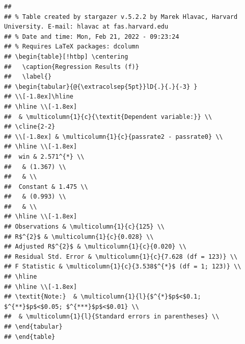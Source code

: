 \documentclass[
  12pt,
  landscape]{article}
\begin{document}
\begin{verbatim}
## 
## % Table created by stargazer v.5.2.2 by Marek Hlavac, Harvard University. E-mail: hlavac at fas.harvard.edu
## % Date and time: Mon, Feb 21, 2022 - 09:23:24
## % Requires LaTeX packages: dcolumn 
## \begin{table}[!htbp] \centering 
##   \caption{Regression Results (f)} 
##   \label{} 
## \begin{tabular}{@{\extracolsep{5pt}}lD{.}{.}{-3} } 
## \\[-1.8ex]\hline 
## \hline \\[-1.8ex] 
##  & \multicolumn{1}{c}{\textit{Dependent variable:}} \\ 
## \cline{2-2} 
## \\[-1.8ex] & \multicolumn{1}{c}{passrate2 - passrate0} \\ 
## \hline \\[-1.8ex] 
##  win & 2.571^{*} \\ 
##   & (1.367) \\ 
##   & \\ 
##  Constant & 1.475 \\ 
##   & (0.993) \\ 
##   & \\ 
## \hline \\[-1.8ex] 
## Observations & \multicolumn{1}{c}{125} \\ 
## R$^{2}$ & \multicolumn{1}{c}{0.028} \\ 
## Adjusted R$^{2}$ & \multicolumn{1}{c}{0.020} \\ 
## Residual Std. Error & \multicolumn{1}{c}{7.628 (df = 123)} \\ 
## F Statistic & \multicolumn{1}{c}{3.538$^{*}$ (df = 1; 123)} \\ 
## \hline 
## \hline \\[-1.8ex] 
## \textit{Note:}  & \multicolumn{1}{l}{$^{*}$p$<$0.1; $^{**}$p$<$0.05; $^{***}$p$<$0.01} \\ 
##  & \multicolumn{1}{l}{Standard errors in parentheses} \\ 
## \end{tabular} 
## \end{table}
\end{verbatim}
\end{document}

